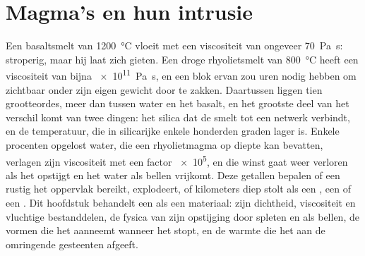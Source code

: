 \chapter{Magma's en hun intrusie}\label{ch:b2:magma-emplacement}

Een basaltsmelt van \qty{1200}{\celsius} vloeit met een viscositeit van ongeveer
\qty{70}{Pa.s}: stroperig, maar hij laat zich gieten. Een droge rhyolietsmelt van \qty{800}{\celsius}
heeft een viscositeit van bijna \qty{e11}{Pa.s}, en een blok ervan zou uren nodig hebben om
zichtbaar onder zijn eigen gewicht door te zakken. Daartussen liggen tien grootteordes, meer
dan tussen water en het basalt, en het grootste deel van het verschil komt van twee
dingen: het silica dat de smelt tot een netwerk verbindt, en de temperatuur,
die in silicarijke  enkele honderden graden lager is. Enkele procenten
opgelost water, die een rhyolietmagma op diepte kan bevatten, verlagen zijn viscositeit
met een factor \num{e5}, en die winst gaat weer verloren als het  opstijgt en het
water als bellen vrijkomt. Deze getallen bepalen of een  rustig het
oppervlak bereikt, explodeert, of kilometers diep stolt als een , een  of een
. Dit hoofdstuk behandelt een  als een materiaal: zijn dichtheid, viscositeit en
vluchtige bestanddelen, de fysica van zijn opstijging door spleten en als bellen, de vormen die het
aanneemt wanneer het stopt, en de warmte die het aan de omringende gesteenten afgeeft.

